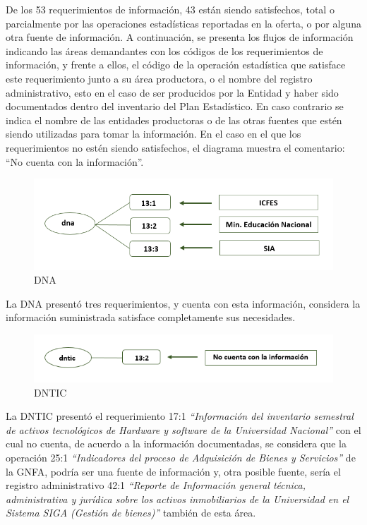 \documentclass[
]{book}
\begin{document}
De los 53 requerimientos de información, 43 están siendo satisfechos, total o parcialmente por las
operaciones estadísticas reportadas en la oferta, o por alguna otra fuente de información. A continuación, se presenta los flujos de información indicando las áreas demandantes con los
códigos de los requerimientos de información, y frente a ellos, el código de la operación
estadística que satisface este requerimiento junto a su área productora, o el nombre del registro
administrativo, esto en el caso de ser producidos por la Entidad y haber sido documentados
dentro del inventario del Plan Estadístico. En caso contrario se indica el nombre de las entidades
productoras o de las otras fuentes que estén siendo utilizadas para tomar la información. En el
caso en el que los requerimientos no estén siendo satisfechos, el diagrama muestra el comentario:
``No cuenta con la información''.

\begin{figure}

{\centering \includegraphics[width=0.75\linewidth]{Imagenes/ima2} 

}

\caption{DNA}\label{fig:unnamed-chunk-30}
\end{figure}

La DNA presentó tres requerimientos, y cuenta con esta información, considera la información
suministrada satisface completamente sus necesidades.

\begin{figure}

{\centering \includegraphics[width=0.75\linewidth]{Imagenes/ima3} 

}

\caption{DNTIC}\label{fig:unnamed-chunk-31}
\end{figure}

La DNTIC presentó el requerimiento 17:1 \emph{``Información del inventario semestral de activos tecnológicos de Hardware y software de la Universidad Nacional''} con el cual no cuenta, de
acuerdo a la información documentadas, se considera que la operación 25:1 \emph{``Indicadores del proceso de Adquisición de Bienes y Servicios''} de la GNFA, podría ser una fuente de información y,
otra posible fuente, sería el registro administrativo 42:1 \emph{``Reporte de Información general técnica, administrativa y jurídica sobre los activos inmobiliarios de la Universidad en el Sistema SIGA (Gestión de bienes)''} también de esta área.
\end{document}
